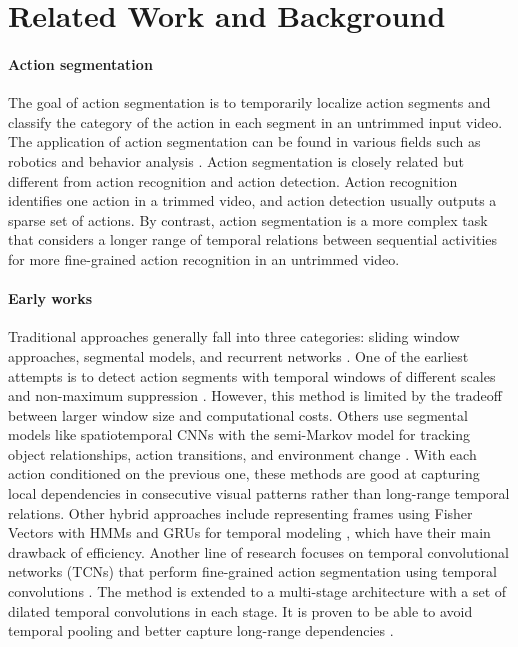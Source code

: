 \newcommand{\red}[1]{{\color{red}{#1}}}


\section{Related Work and Background}
\paragraph{Action segmentation} The goal of action segmentation is to temporarily localize action segments and classify the category of the action in each segment in an untrimmed input video. The application of action segmentation can be found in various fields such as robotics \cite{robotics_action_seg} and behavior analysis \cite{shao2012human}. Action segmentation is closely related but different from action recognition and action detection. Action recognition identifies one action in a trimmed video, and action detection usually outputs a sparse set of actions. By contrast, action segmentation is a more complex task that considers a longer range of temporal relations between sequential activities for more fine-grained action recognition in an untrimmed video.

\paragraph{Early works}
Traditional approaches generally fall into three categories: sliding window approaches, segmental models, and recurrent networks \cite{graphbased2020}. One of the earliest attempts is to detect action segments with temporal windows of different scales and non-maximum suppression \cite{6247801}. However, this method is limited by the tradeoff between larger window size and computational costs. Others use segmental models like spatiotemporal CNNs with the semi-Markov model for tracking object relationships, action transitions, and environment change \cite{lea2016segmental, 6619177}. With each action conditioned on the previous one, these methods are good at capturing local dependencies in consecutive visual patterns rather than long-range temporal relations. Other hybrid approaches include representing frames using Fisher Vectors with HMMs and GRUs for temporal modeling \cite{7477701, 8099623}, which have their main drawback of efficiency. Another line of research focuses on temporal convolutional networks (TCNs) that perform fine-grained action segmentation using temporal convolutions \cite{lea2016temporal}. The method is extended to a multi-stage architecture with a set of dilated temporal
convolutions in each stage. It is proven to be able to avoid temporal pooling and better capture long-range dependencies \cite{farha2019mstcn}.  

